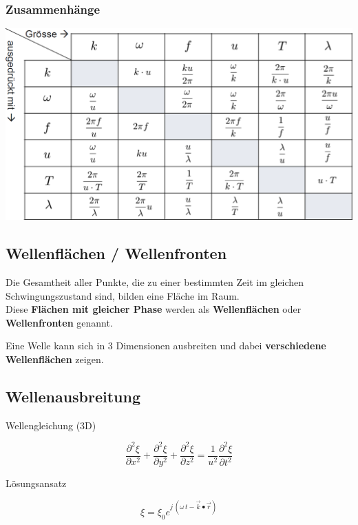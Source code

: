 \subsubsection{Zusammenhänge}
\includegraphics[width=0.8\linewidth]{Bilder/Wellen-Optik/harmonische_wellen_zusammenhaenge}






\subsection{Wellenflächen / Wellenfronten}
Die Gesamtheit aller Punkte, die zu einer bestimmten Zeit im gleichen Schwingungszustand sind, bilden eine Fläche im Raum. \\

Diese \textbf{Flächen mit gleicher Phase} werden als \textbf{Wellenflächen} oder \textbf{Wellenfronten} genannt.\\
\vspace{0.2cm}

Eine Welle kann sich in 3 Dimensionen ausbreiten und dabei \textbf{verschiedene Wellenflächen} zeigen. 




\subsection{Wellenausbreitung}

\begin{minipage}{0.25\linewidth}
Wellengleichung (3D)
\end{minipage}
\hfill
\begin{minipage}{0.73\linewidth}
$$\boxed{ \frac{\partial^2 \xi}{\partial x^2} + \frac{\partial^2 \xi}{\partial y^2} + \frac{\partial^2 \xi}{\partial z^2} = \frac{1}{u^2} \frac{\partial^2 \xi}{\partial t^2}  }$$
\end{minipage}

\begin{minipage}{0.25\linewidth}
Lösungsansatz \\
\end{minipage}
\hfill
\begin{minipage}{0.73\linewidth}
$$ \boxed{ \xi = \xi_0 e^{j \, (\omega \, t - \vec{k} \bullet \vec{r})} }$$ \\
\end{minipage}

